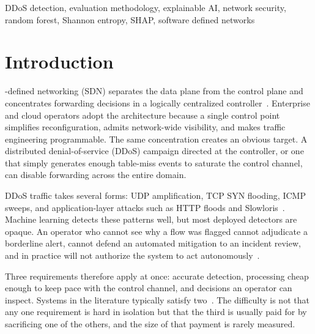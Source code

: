 \documentclass{ieeeaccess}
\begin{document}
\begin{keywords}
DDoS detection, evaluation methodology, explainable AI, network security, random forest, Shannon entropy, SHAP, software defined networks
\end{keywords}

\titlepgskip=-21pt

\maketitle

\section{Introduction}
\label{sec:intro}

-defined networking (SDN) separates the data plane from the control plane and concentrates forwarding decisions in a logically centralized controller~\cite{mckeown2008openflow,kreutz2015sdn}. Enterprise and cloud operators adopt the architecture because a single control point simplifies reconfiguration, admits network-wide visibility, and makes traffic engineering programmable. The same concentration creates an obvious target. A distributed denial-of-service (DDoS) campaign directed at the controller, or one that simply generates enough table-miss events to saturate the control channel, can disable forwarding across the entire domain.

DDoS traffic takes several forms: UDP amplification, TCP SYN flooding, ICMP sweeps, and application-layer attacks such as HTTP floods and Slowloris~\cite{mirkovic2004taxonomy,sharafaldin2019ddos,bhuyan2014network}. Machine learning detects these patterns well, but most deployed detectors are opaque. An operator who cannot see why a flow was flagged cannot adjudicate a borderline alert, cannot defend an automated mitigation to an incident review, and in practice will not authorize the system to act autonomously~\cite{arrieta2020xai,guidotti2018survey,warnecke2020evaluating,samed2025xaiids}.

Three requirements therefore apply at once: accurate detection, processing cheap enough to keep pace with the control channel, and decisions an operator can inspect. Systems in the literature typically satisfy two~\cite{mousavi2015early,jain2024ddossurvey}. The difficulty is not that any one requirement is hard in isolation but that the third is usually paid for by sacrificing one of the others, and the size of that payment is rarely measured.
\end{document}
